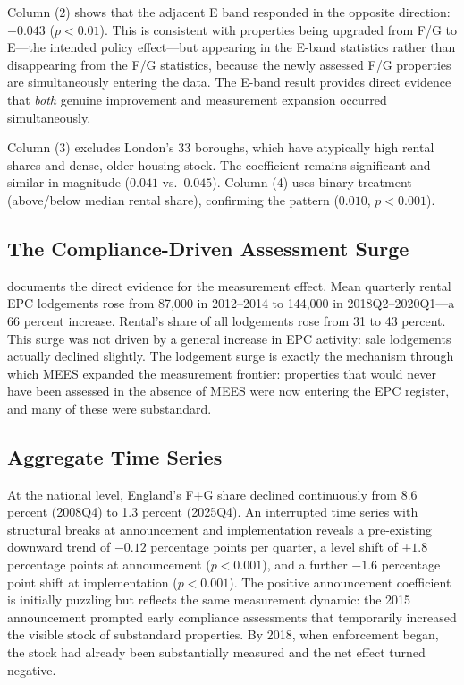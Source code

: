 \documentclass[12pt]{article}
\begin{document}
Column (2) shows that the adjacent E band responded in the opposite direction: $-0.043$ ($p < 0.01$). This is consistent with properties being upgraded from F/G to E---the intended policy effect---but appearing in the E-band statistics rather than disappearing from the F/G statistics, because the newly assessed F/G properties are simultaneously entering the data. The E-band result provides direct evidence that \textit{both} genuine improvement and measurement expansion occurred simultaneously.

Column (3) excludes London's 33 boroughs, which have atypically high rental shares and dense, older housing stock. The coefficient remains significant and similar in magnitude ($0.041$ vs.\ $0.045$). Column (4) uses binary treatment (above/below median rental share), confirming the pattern ($0.010$, $p < 0.001$).



\subsection{The Compliance-Driven Assessment Surge}

 documents the direct evidence for the measurement effect. Mean quarterly rental EPC lodgements rose from 87,000 in 2012--2014 to 144,000 in 2018Q2--2020Q1---a 66 percent increase. Rental's share of all lodgements rose from 31 to 43 percent. This surge was not driven by a general increase in EPC activity: sale lodgements actually declined slightly. The lodgement surge is exactly the mechanism through which MEES expanded the measurement frontier: properties that would never have been assessed in the absence of MEES were now entering the EPC register, and many of these were substandard.



\subsection{Aggregate Time Series}

At the national level, England's F+G share declined continuously from 8.6 percent (2008Q4) to 1.3 percent (2025Q4). An interrupted time series with structural breaks at announcement and implementation reveals a pre-existing downward trend of $-0.12$ percentage points per quarter, a level shift of $+1.8$ percentage points at announcement ($p < 0.001$), and a further $-1.6$ percentage point shift at implementation ($p < 0.001$). The positive announcement coefficient is initially puzzling but reflects the same measurement dynamic: the 2015 announcement prompted early compliance assessments that temporarily increased the visible stock of substandard properties. By 2018, when enforcement began, the stock had already been substantially measured and the net effect turned negative.
\end{document}
